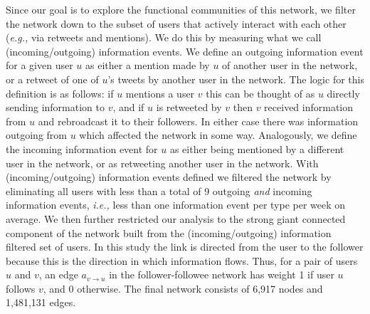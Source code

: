 \documentclass[10pt,letterpaper]{article}
\begin{document}
Since our goal is to explore the functional communities of this network, we filter the network down to the subset of users that actively interact with each other ({\it e.g.,} via retweets and mentions). We do this by measuring what we call (incoming/outgoing) information events. We define an outgoing information event for a given user $u$ as either a mention made by $u$ of another user in the network, or a retweet of one of $u$'s tweets by another user in the network. The logic for this definition is as follows: if $u$ mentions a user $v$ this can be thought of as $u$ directly sending information to $v$, and if $u$ is retweeted by $v$ then $v$ received information from $u$ and rebroadcast it to their followers. In either case there was information outgoing from $u$ which affected the network in some way. Analogously, we define the incoming information event for $u$ as either being mentioned by a different user in the network, or as retweeting another user in the network.
With (incoming/outgoing) information events defined we filtered the network by eliminating all users with less than a total of 9 outgoing \emph{and} incoming information events, {\it i.e.,} less than one information event per type per week on average. 
We then further restricted our analysis to the strong giant connected component of the network built from the (incoming/outgoing) information filtered set of users. %
In this study the link is directed from the user to the follower because this is the direction in which information flows. Thus, for a pair of users $u$ and $v$, an edge $a_{v \to u}$ in the follower-followee network has weight 1 if user $u$ follows $v$, and 0 otherwise. The final network consists of 6,917 nodes and 1,481,131 edges.
\end{document}
